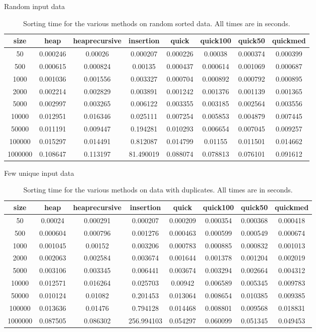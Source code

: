 \documentclass[a4paper,12pt]{article}
\begin{document}
\begin{table}[h]
\caption {Random input data} 
\begin{tabular}{cccccccc}
size & heap & heaprecursive & insertion & quick & quick100 & quick50 & quickmed \\ \hline
50 & 0.000246 & 0.00026 & 0.000207 & 0.000226 & 0.00038 & 0.000374 & 0.000399 \\
500 & 0.000615 & 0.000824 & 0.00135 & 0.000437 & 0.000614 & 0.001069 & 0.000687 \\
1000 & 0.001036 & 0.001556 & 0.003327 & 0.000704 & 0.000892 & 0.000792 & 0.000895 \\
2000 & 0.002214 & 0.002829 & 0.003891 & 0.001242 & 0.001376 & 0.001139 & 0.001365 \\
5000 & 0.002997 & 0.003265 & 0.006122 & 0.003355 & 0.003185 & 0.002564 & 0.003556 \\
10000 & 0.012951 & 0.016346 & 0.025111 & 0.007254 & 0.005853 & 0.004879 & 0.007445 \\
50000 & 0.011191 & 0.009447 & 0.194281 & 0.010293 & 0.006654 & 0.007045 & 0.009257 \\
100000 & 0.015297 & 0.014491 & 0.812087 & 0.014799 & 0.01155 & 0.011501 & 0.014662 \\
1000000 & 0.108647 & 0.113197 & 81.490019 & 0.088074 & 0.078813 & 0.076101 & 0.091612 \\
\end{tabular}
\caption{Sorting time for the various methods on random sorted data.  All times are in seconds.}
\end{table}

\begin{table}[h]
\caption {Few unique input data} 
\begin{tabular}{cccccccc}
size & heap & heaprecursive & insertion & quick & quick100 & quick50 & quickmed \\ \hline
50 & 0.00024 & 0.000291 & 0.000207 & 0.000209 & 0.000354 & 0.000368 & 0.000418 \\
500 & 0.000604 & 0.000796 & 0.001276 & 0.000463 & 0.000599 & 0.000549 & 0.000674 \\
1000 & 0.001045 & 0.00152 & 0.003206 & 0.000783 & 0.000885 & 0.000832 & 0.001013 \\
2000 & 0.002063 & 0.002584 & 0.003674 & 0.001644 & 0.001378 & 0.001204 & 0.002019 \\
5000 & 0.003106 & 0.003345 & 0.006441 & 0.003674 & 0.003294 & 0.002664 & 0.004312 \\
10000 & 0.012571 & 0.016264 & 0.025703 & 0.00942 & 0.006589 & 0.005345 & 0.009783 \\
50000 & 0.010124 & 0.01082 & 0.201453 & 0.013064 & 0.008654 & 0.010385 & 0.009385 \\
100000 & 0.013636 & 0.01476 & 0.794128 & 0.014468 & 0.008801 & 0.009568 & 0.018831 \\
1000000 & 0.087505 & 0.086302 & 256.994103 & 0.054297 & 0.060099 & 0.051345 & 0.049453 \\
\end{tabular}
\caption{Sorting time for the various methods on data with duplicates.  All times are in seconds.}
\end{table}
\end{document}
